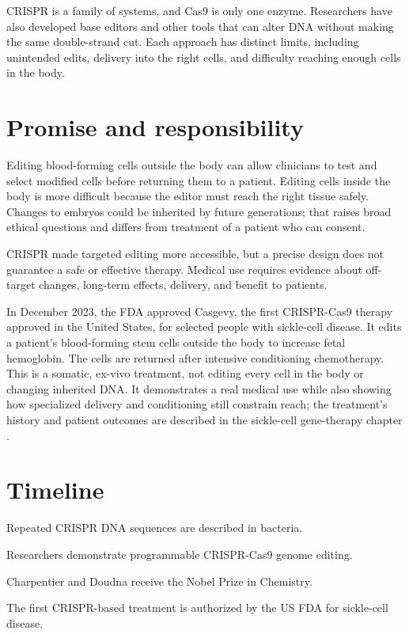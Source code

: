 \documentclass[12pt,oneside]{book}
\begin{document}
CRISPR is a family of systems, and Cas9 is only one enzyme. Researchers have
also developed base editors and other tools that can alter DNA without
making the same double-strand cut. Each approach has distinct limits,
including unintended edits, delivery into the right cells, and difficulty
reaching enough cells in the body.

\section{Promise and responsibility}
Editing blood-forming cells outside the body can allow clinicians to test
and select modified cells before returning them to a patient. Editing cells
inside the body is more difficult because the editor must reach the right
tissue safely. Changes to embryos could be inherited by future generations;
that raises broad ethical questions and differs from treatment of a patient
who can consent.

CRISPR made targeted editing more accessible, but a precise design does not
guarantee a safe or effective therapy. Medical use requires evidence about
off-target changes, long-term effects, delivery, and benefit to patients.

In December 2023, the FDA approved Casgevy, the first CRISPR-Cas9 therapy
approved in the United States, for selected people with sickle-cell disease.
It edits a patient's blood-forming stem cells outside the body to increase
fetal hemoglobin. The cells are returned after intensive conditioning
chemotherapy. This is a somatic, ex-vivo treatment, not editing every cell in
the body or changing inherited DNA. It demonstrates a real medical use while
also showing how specialized delivery and conditioning still constrain reach;
the treatment's history and patient outcomes are described in the sickle-cell
gene-therapy chapter \cite{fdaSickleGeneTherapy,fdaCasgevyPediatric}.

\section*{Timeline}
\begin{description}[leftmargin=2.3cm,style=nextline]
  \item[1980s] Repeated CRISPR DNA sequences are described in bacteria.
  \item[2012] Researchers demonstrate programmable CRISPR-Cas9 genome editing.
  \item[2020] Charpentier and Doudna receive the Nobel Prize in Chemistry.
  \item[2023] The first CRISPR-based treatment is authorized by the US FDA for sickle-cell disease.
\end{description}
\end{document}
